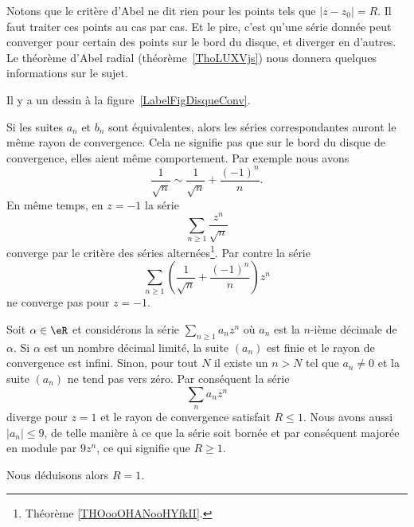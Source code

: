 Notons que le critère d'Abel ne dit rien pour les points tels que \( | z-z_0 |=R\). Il faut traiter ces points au cas par cas. Et le pire, c'est qu'une série donnée peut converger pour certain des points sur le bord du disque, et diverger en d'autres. Le théorème d'Abel radial (théorème~\ref{ThoLUXVjs}) nous donnera quelques informations sur le sujet.

Il y a un dessin à la figure~\ref{LabelFigDisqueConv}.
\newcommand{\CaptionFigDisqueConv}{À l'intérieur du disque de convergence, la convergence est absolue. En dehors, la série diverge. Sur le cercle proprement dit, tout peut arriver.}


Si les suites \( a_n\) et \( b_n\) sont équivalentes, alors les séries correspondantes auront le même rayon de convergence. Cela ne signifie pas que sur le bord du disque de convergence, elles aient même comportement. Par exemple nous avons
\begin{equation}
	\frac{1}{ \sqrt{n} }\sim \frac{1}{ \sqrt{n} }+\frac{ (-1)^n }{ n }.
\end{equation}
En même temps, en \( z=-1\) la série
\begin{equation}
	\sum_{n\geq 1}\frac{ z^n }{ \sqrt{n} }
\end{equation}
converge par le critère des séries alternées\footnote{Théorème \ref{THOooOHANooHYfkII}.}. Par contre la série
\begin{equation}
	\sum_{n\geq 1}\left( \frac{1}{ \sqrt{n} }+\frac{ (-1)^n }{ n } \right)z^n
\end{equation}
ne converge pas pour \( z=-1\).

\begin{example}
	Soit \( \alpha\in \eR\) et considérons la série \( \sum_{n\geq 1}a_nz^n\) où \( a_n\) est la \( n\)-ième décimale de \( \alpha\). Si \( \alpha\) est un nombre décimal limité, la suite \( (a_n)\) est finie et le rayon de convergence est infini. Sinon, pour tout \( N\) il existe un \( n>N\) tel que \( a_n\neq 0\) et la suite \( (a_n)\) ne tend pas vers zéro. Par conséquent la série
	\begin{equation}
		\sum_{n}a_nz^n
	\end{equation}
	diverge pour \( z=1\) et le rayon de convergence satisfait \( R\leq 1\). Nous avons aussi \( | a_n |\leq 9\), de telle manière à ce que la série soit bornée et par conséquent majorée en module par \( 9z^n\), ce qui signifie que \( R\geq 1\).

	Nous déduisons alors \( R=1\).
\end{example}

